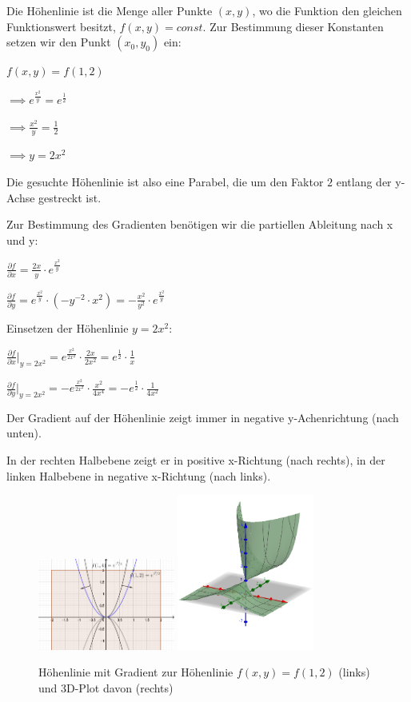 \item 

Die Höhenlinie ist die Menge aller Punkte $(x,y)$, wo die Funktion den gleichen Funktionswert besitzt, $f(x,y) = const.$ Zur Bestimmung dieser Konstanten setzen wir den Punkt $(x_0,y_0)$ ein:

$f(x,y) = f(1,2)$

$\implies e^{\frac{x^2}{y}} = e^{\frac{1}{2}}$

$\implies \frac{x^2}{y} = \frac{1}{2}$

$\implies y = 2x^2$

Die gesuchte Höhenlinie ist also eine Parabel, die um den Faktor $2$ entlang der y-Achse gestreckt ist.

Zur Bestimmung des Gradienten benötigen wir die partiellen Ableitung nach x und y:

$\frac{\partial f}{\partial x} =  \frac{2x}{y} \cdot e^{\frac{x^2}{y}}$

$\frac{\partial f}{\partial y} =  e^{\frac{x^2}{y}} \cdot (-y^{-2} \cdot x^2) = - \frac{x^2}{y^2} \cdot e^{\frac{x^2}{y}} $

Einsetzen der Höhenlinie $y=2x^2$:

$\frac{\partial f}{\partial x}|_{y=2x^2}=  e^{\frac{x^2}{2x^2}} \cdot \frac{2x}{2x^2} = e^{\frac{1}{2}}\cdot \frac{1}{x}$

$\frac{\partial f}{\partial y}|_{y=2x^2} =  -e^{\frac{x^2}{2x^2}} \cdot \frac{x^2}{4x^4} = -e^{\frac{1}{2}}\cdot \frac{1}{4x^2}$

Der Gradient auf der Höhenlinie zeigt immer in negative y-Achenrichtung (nach unten).

In der rechten Halbebene zeigt er in positive x-Richtung (nach rechts), in der linken Halbebene in negative x-Richtung (nach links).

\begin{figure}[ht]
\centering
  \includegraphics[width=0.4\textwidth]{../pool/ex-graph-contour-1-img-a.png}
  \includegraphics[width=0.4\textwidth]{../pool/ex-graph-contour-1-img-b.png}
  \caption{Höhenlinie mit Gradient zur Höhenlinie $f(x,y)=f(1,2)$ (links) und 3D-Plot davon (rechts)}
\end{figure}

